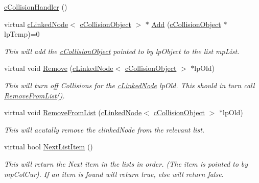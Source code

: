 \begin{DoxyCompactItemize}
\item 
\hyperlink{classc_collision_handler_a3f8419c4bc62b4f43242f5b467253874}{cCollisionHandler} ()
\item 
virtual \hyperlink{classc_linked_node}{cLinkedNode}$<$ \hyperlink{classc_collision_object}{cCollisionObject} $>$ $\ast$ \hyperlink{classc_collision_handler_ae966359105ed5e144f62e36dd85d1f03}{Add} (\hyperlink{classc_collision_object}{cCollisionObject} $\ast$lpTemp)=0
\begin{DoxyCompactList}\small\item\em This will add the \hyperlink{classc_collision_object}{cCollisionObject} pointed to by lpObject to the list mpList. \item\end{DoxyCompactList}\item 
virtual void \hyperlink{classc_collision_handler_aec2e30bb6be227d30daef0b6eb36d3b3}{Remove} (\hyperlink{classc_linked_node}{cLinkedNode}$<$ \hyperlink{classc_collision_object}{cCollisionObject} $>$ $\ast$lpOld)
\begin{DoxyCompactList}\small\item\em This will turn off Collisions for the \hyperlink{classc_linked_node}{cLinkedNode} lpOld. This should in turn call \hyperlink{classc_collision_handler_ad2d0933b78c692a5d2b3885242fa0911}{RemoveFromList()}. \item\end{DoxyCompactList}\item 
virtual void \hyperlink{classc_collision_handler_ad2d0933b78c692a5d2b3885242fa0911}{RemoveFromList} (\hyperlink{classc_linked_node}{cLinkedNode}$<$ \hyperlink{classc_collision_object}{cCollisionObject} $>$ $\ast$lpOld)
\begin{DoxyCompactList}\small\item\em This will acutally remove the clinkedNode from the relevant list. \item\end{DoxyCompactList}\item 
virtual bool \hyperlink{classc_collision_handler_a906305fe520cefc195f3948458aba941}{NextListItem} ()
\begin{DoxyCompactList}\small\item\em This will return the Next item in the lists in order. (The item is pointed to by mpColCur). If an item is found will return true, else will return false. \item\end{DoxyCompactList}\item 

\end{DoxyCompactItemize}
